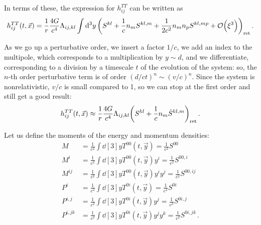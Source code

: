\documentclass[main.tex]{subfiles}
\begin{document}
In terms of these, the expression for \(h_{ij}^{TT}\) can be written as 
%
\begin{align}
h_{ij}^{TT} (t, \vec{x}) = \frac{1}{r} \frac{4G}{c^{4}} \Lambda_{ij, kl} \int \dd[3]{y}
\qty(S^{kl} + \frac{1}{c} n_{m} S^{kl, m} + \frac{1}{2 c^2} n_m n_p S^{kl, mp} + \order{\xi^3})_{\text{ret}}
\,.
\end{align}

As we go up a perturbative order, we insert a factor \(1/c\), we add an index to the multipole, which corresponds to a multiplication by \(y \sim d\), and we differentiate, corresponding to a division by a timescale \(t\) of the evolution of the system: so, the \(n\)-th order perturbative term is of order \((d/ct)^{n} \sim (v/c)^{n}\).
Since the system is nonrelativistic, \(v/c\) is small compared to 1, so we can stop at the first order and still get a good result:
%
\begin{align}
h_{ij}^{TT} (t, \vec{x}) \approx \frac{1}{r} \frac{4G}{c^{4}}
\Lambda_{ij, kl} \qty( S^{kl} + \frac{1}{c} n_m \dot{S}^{kl, m})_{\text{ret}}
\,.
\end{align}

Let us define the moments of the energy and momentum densities: 
%
\begin{align}
M &= \frac{1}{c^2} \int \dd[3]{y} T^{00}(t, \vec{y}) = \frac{1}{c^2} S^{00} \\ 
M^{i} &= \frac{1}{c^2} \int \dd[3]{y} T^{00}(t, \vec{y})y^{i} = \frac{1}{c^2} S^{00,i} \\ 
M^{ij} &= \frac{1}{c^2} \int \dd[3]{y} T^{00}(t, \vec{y})y^{i}y^{j} = \frac{1}{c^2} S^{00,ij} \\ 
P^{i} &= \frac{1}{c^2} \int \dd[3]{y} T^{0i} (t, \vec{y}) = \frac{1}{c^2} S^{0i} \\  
P^{i,j} &= \frac{1}{c^2} \int \dd[3]{y} T^{0i} (t, \vec{y}) y^{j} = \frac{1}{c^2} S^{0i,j} \\  
P^{i,jk} &= \frac{1}{c^2} \int \dd[3]{y} T^{0i} (t, \vec{y}) y^{j}y^{k} = \frac{1}{c^2} S^{0i,jk}
\,.
\end{align}
\end{document}
